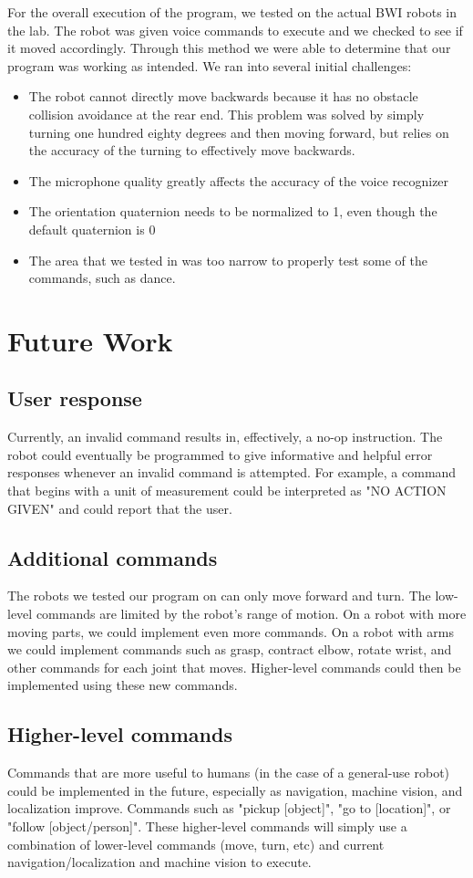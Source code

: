 \documentclass{article}
\begin{document}
\noindent For the overall execution of the program, we tested on the actual BWI robots in the lab. The robot was given voice commands to execute and we checked to see if it moved accordingly. Through this method we were able to determine that our program was working as intended. We ran into several initial challenges:
\begin{itemize}
    \item The robot cannot directly move backwards because it has no obstacle collision avoidance at the rear end. This problem was solved by simply turning one hundred eighty degrees and then moving forward, but relies on the accuracy of the turning to effectively move backwards.
    \item The microphone quality greatly affects the accuracy of the voice recognizer
    \item The orientation quaternion needs to be normalized to 1, even though the default quaternion is 0
    \item The area that we tested in was too narrow to properly test some of the commands, such as dance. 
\end{itemize}

\section{Future Work}
\subsection{User response}
Currently, an invalid command results in, effectively, a no-op instruction. The robot could eventually be programmed to give informative and helpful error responses whenever an invalid command is attempted. For example, a command that begins with a unit of measurement could be interpreted as "NO ACTION GIVEN" and could report that the user.
\subsection{Additional commands}
The robots we tested our program on can only move forward and turn. The low-level commands are limited by the robot's range of motion. On a robot with more moving parts, we could implement even more commands. On a robot with arms we could implement commands such as grasp, contract elbow, rotate wrist, and other commands for each joint that moves. Higher-level commands could then be implemented using these new commands.
\subsection{Higher-level commands}
Commands that are more useful to humans (in the case of a general-use robot) could be implemented in the future, especially as navigation, machine vision, and localization improve. Commands such as "pickup [object]", "go to [location]", or "follow [object/person]". These higher-level commands will simply use a combination of lower-level commands (move, turn, etc) and current navigation/localization and machine vision to execute.
\end{document}
